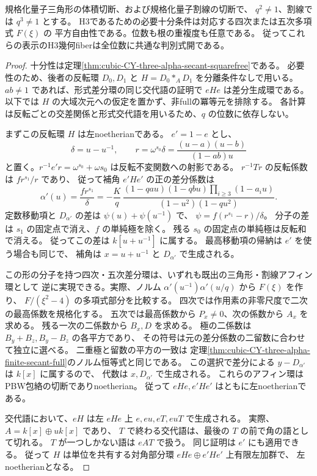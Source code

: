 \begin{theorem}\label{thm:cubic-CY-three-alpha-nontorsion-full-folded}
規格化量子三角形の体積切断、および規格化量子割線の切断で、
$q^2\ne1$、割線では $q^3\ne1$ とする。
H3であるための必要十分条件は対応する四次または五次多項式 $F(\xi)$ の
平方自由性である。位数も根の重複度も任意である。
従ってこれらの表示のH3幾何fiberは全位数に共通な判別式開である。
\end{theorem}
\begin{proof}
十分性は定理\ref{thm:cubic-CY-three-alpha-secant-squarefree}である。
必要性のため、後者の反転環 $D_0,D_1$ と
$H=D_0*_A D_1$ を分離条件なしで用いる。
$ab\ne1$ であれば、形式差分環の同じ交代語の証明で $eHe$ は差分生成環である。
以下では $H$ の大域次元への仮定を置かず、非fullの冪等元を排除する。
各計算は反転ごとの交差関係と形式交代語を用いるため、$q$ の位数に依存しない。

まずこの反転環 $H$ は左noetherianである。
$e'=1-e$ とし、
\[
 \delta=u-u^{-1},\qquad r=\omega^{s_0}\delta
       =\frac{(u-a)(u-b)}{(1-ab)u}
\]
と置く。$r^{-1}e'r=\omega^{s_0}+\omega s_0$ は反転不変関数への射影である。
$r^{-1}Tr$ の反転係数は $f r^{s_1}/r$ であり、
従って補角 $e'He'$ の正の差分係数は
\[
 \alpha'(u)=\frac{f r^{s_1}}{\delta}
 =-\frac{K}{q}\,
 \frac{(1-qau)(1-qbu)\prod_{i\ge3}(1-a_i u)}
      {(1-u^2)(1-qu^2)} .
\]
定数移動項と $D_{\alpha'}$ の差は
$\psi(u)+\psi(u^{-1})$ で、
$\psi=f(r^{s_1}-r)/\delta$。
分子の差は $s_1$ の固定点で消え、$f$ の単純極を除く。
残る $s_0$ の固定点の単純極は反転和で消える。
従ってこの差は $k[u+u^{-1}]$ に属する。
最高移動項の帰納は $e'$ を使う場合も同じで、
補角は $x=u+u^{-1}$ と $D_{\alpha'}$ で生成される。

この形の分子を持つ四次・五次差分環は、いずれも既出の三角形・割線アフィン環として
逆に実現できる。実際、ノルム
$\alpha'(u^{-1})\alpha'(u/q)$ から $F(\xi)$ を作り、
$F/(\xi^2-4)$ の多項式部分を比較する。
四次では作用素の非零尺度で二次の最高係数を規格化する。
五次では最高係数から $P_x\ne0$、次の係数から $A_x$ を求める。
残る一次の二係数から $B_x,D$ を求める。
極の二係数は $B_y+B_z,B_y-B_z$ の各平方であり、
その符号は元の差分係数の二留数に合わせて独立に選べる。
二重極と留数の平方の一致は
定理\ref{thm:cubic-CY-three-alpha-finite-secant-full}のノルム恒等式と同じである。
この選択で差分による $y-D_{\alpha'}$ は $k[x]$ に属するので、
代数は $x,D_{\alpha'}$ で生成される。
これらのアフィン環はPBW包絡の切断でありnoetherian。
従って $eHe,e'He'$ はともに左noetherianである。

交代語において、$eH$ は左 $eHe$ 上
$e,eu,eT,euT$ で生成される。
実際、$A=k[x]\oplus u k[x]$ であり、
$T$ で終わる交代語は、最後の $T$ の前で角の語として切れる。
$T$ が一つしかない語は $eA T$ で扱う。
同じ証明は $e'$ にも適用できる。
従って $H$ は単位を共有する対角部分環 $eHe\oplus e'He'$ 上有限左加群で、
左noetherianとなる。


\end{proof}
